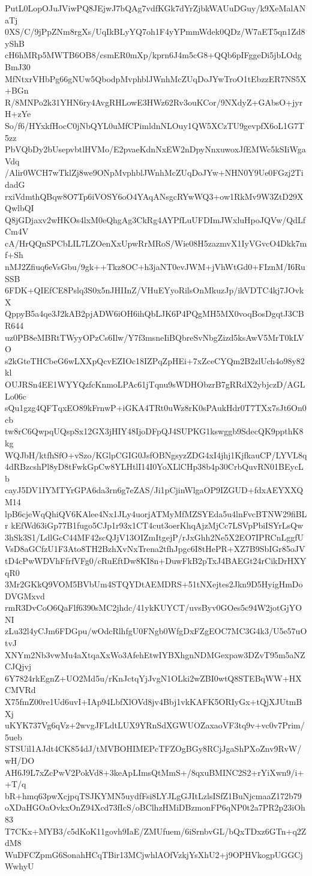 PutL0LopOJuJViwPQ8JEjwJ7bQAg7vdfKGk7dYrZjbkWAUuDGuy/k9XeMalANaTj
0XS/C/9jPpZNm8rgXs/UqIkBLyYQ7oh1F4yYPmmWdek0QDz/W7aET5qn1Zd8yShB
cH6hMRp5MWTB6OB8/csmER0mXp/kprn6J4m5cG8+QQb6pIFggeDi5jbLOdgBmJ30
MfNtxrVHbPg66gNUw5QbodpMvphblJWnhMcZUqDoJYwTroO1tEbzzER7NS5X+BGn
R/8MNPo2k31YHN6ry4AvgRHLowE3HWz62Rv3ouKCor/9NXdyZ+GAbsO+jyrH+zYe
So/f6/HYxkfHocC0jNbQYL0uMfCPimldnNLOuy1QW5XCzTU9gevpfX6oL1G7T5zz
PbVQbDy2bUsepvbtlHVMo/E2pvaeKdnNxEW2nDpyNnxuwoxJfEMWc5kSIiWgaVdq
/Alir0WCH7wTklZj8we9ONpMvphblJWnhMcZUqDoJYw+NHN0Y9Ue0FGzj2TidadG
rxiVdmthQBqw8O7Tp6iVOSY6oO4YAqANsgcRYwWQ3+ow1RkMv9W3ZtD29XQwlbQI
Q8jGDjaxv2wHKOs4lxM0eQhgAg3CkRg4AYPfLuUFDImJWxluHpoJQVw/QdLfCm4V
cA/HrQQnSPCbLIL7LZOenXxUpwRrMRoS/Wie08H5zazmvX1IyVGvcO4Dkk7mf+Sh
nMJ2Zfiuq6eVsGbu/9gk++Tkz8OC+h3jaNT0evJWM+jVhWtGd0+FIznM/I6RuSSB
6FDK+QIEfCE8Pslq3S0x5nJHIInZ/VHuEYyoRilsOnMkuzJp/ikVDTC4kj7JOvkX
QppyB5a4qe3J2kAB2pjADW6iOH6ihQbLJK6P4PQgMH5MX0voqBosDgqtJ3CBR644
uz0PB8eMBRtTWyyOPzCs6Ilw/Y7f3msneIiBQbreSvNbgZizd5ksAwV5MrT0kLVO
s2kGteTHCbeG6wLXXpQcvEZIOc18IZPqZpHEi+7xZceCYQm2B2zlUch4o98y82kl
OUJRSn4EE1WYYQzfcKnmoLPAc61jTqnu9sWDHObzrB7gRRdX2ybjczD/AGLLo06c
sQu1gzg4QFTqxEO89kFrnwP+iGKA4TRt0uWz8rK0sPAukHdr0T7TXx7sJt6On0cb
tw8rC6QwpqUQspSx12GX3jHIY48IjoDFpQJ4SUPKG1kswggb9SdecQK9ppthK8kg
WQJbH/ktfhSfO+vSzo/KGlpCGIG0JsfOBNgsyzZDG4xI4jhj1KjfkauCP/LYVL8q
4dRBzcshPl8yD8tFwkGpCw8YLHtlI14I0YoXLlCHp38b4p30CrbQuvRN01BEycLb
cayJ5DV1IYMTYrGPA6da3rn6g7eZAS/Ji1pCjinWlgaOP9IZGUD+fdxAEYXXQM14
lpB6cjeWqQhiQV6KAlee4Nx1JLy4uorjATMyMfMZSYEda5u4lnFvcBTNW29fiBLr
kEfWd63iGp77B1fugo5CJp1r93x1CT4cut3oerKhqAjzMjCc7LSVpPbiISYrLsQw
3hSk3S1/LdlGcC44MF42scQJjV13OIZmItgejP/rJxGhh2Ne5X2EO7IPRCnLggfU
VsD8aGCfzU1F3Ato8TH2BzhXvNxTrena2tfhJpgc6I8tHePR+XZ7B9SbIGr85oJV
tD4cPwWDVhFfrfVFg0/cRuEftDw8KI8n+DuwFkB2pTxJ4BAEGt24rCikDrHXYqR0
3Mr2GKkQ9VOM5BVbUm4STQYDtAEMDRS+51tNXejtes2Jkn9D5HyigHmDoDVGMxvd
rmR3DvCoO6QaFlf6390sMC2jhdc/41ykKUYCT/uvsByv0GOes5c94W2jotGjYONI
zLu32l4yCJm6FDGpu/wOdcRlhfgU0FNgb0WfgDxFZgEOC7MC3G4k3/U5e57uOtvJ
XNYm2Nb3vwMu4aXtqaXxWo3AfehEtwIYBXhgnNDMGexpaw3DZvT95m5aNZCJQjvj
6Y7824rkEgnZ+UO2Md5u/rKnJctqYjJvgN1OLki2wZBI0wtQ8STEBqWW+HXCMVRd
X75fmZ00re1Ud6uvI+IAp94LbfXlOVd8jv4Bbj1vkKAFK5ORIyGx+tQjXJUtmBXj
uKYK737Vg6qVz+2wvgJFLdtLUX9YRnSdXGWUOZaxaoVF3tq9v+vc0v7Prim/5ueb
STSUil1AJdt4CK854dJ/tMVBOHIMEPcTFZOgBGy8RCjJgaShPXoZnv9RvW/wH/DO
AH6J9L7xZcPwV2PokVd8+3keApLImsQtMmS+/8qxuBMINC2S2+rYiXwn9/i++T/q
bR+hmq63pwXcjpqTSJKYMN5uydfFsi8LYJLgGJItLzlsISfZ1BuNjcmaaZ172b79
oXDaHGOaOvkxOnZ94Xcd73fIcS/oBClhzHMiDBzmonFP6qNP0t2a7PR2p23iOh83
T7CKx+MYB3/c5dKoK11govh9IaE/ZMUfuem/6iSrnbvGL/bQxTDxz6GTn+q2ZdM8
WuDFCZpmG6SonahHCqTBir13MCjwhlAOfVzkjYsXhU2+j9OPHVkogpUGGCjWwhyU
